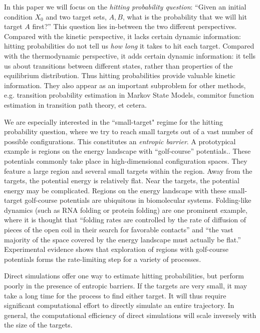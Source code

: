 \documentclass[english, aip, jcp, priprint, graphicx,floatfix]{revtex4-1}
\theoremstyle{plain}
\theoremstyle{definition}
\theoremstyle{plain}
\begin{document}
In this paper we will focus on the \emph{hitting probability question}: ``Given an initial condition $X_0$ and two target sets, $A,B$, what is the probability that we will hit target $A$ first?'' This question lies in-between the two different perspectives. Compared with the kinetic perspective, it lacks certain dynamic information: hitting probabilities do not tell us \emph{how long} it takes to hit each target.  Compared with the thermodynamic perspective, it adds certain dynamic information: it tells us about transitions between different states, rather than properties of the equilibrium distribution. Thus hitting probabilities provide valuable kinetic information.  They also appear as an important subproblem for other methods, e.g. transition probability estimation in Markov State Models, commitor function estimation in transition path theory, et cetera.

We are especially interested in the ``small-target" regime for the hitting probability question, where we try to reach small targets out of a vast number of possible configurations. This constitutes an \emph{entropic barrier}. A prototypical example is regions on the energy landscape with ``golf-course'' potentials.\cite{bicout2000entropic, Baum1986-we, Wille1987-tf}. These potentials commonly take place in high-dimensional configuration spaces. They feature a large region and several small targets within the region.  Away from the targets, the potential energy is relatively flat.  Near the targets, the potential energy may be complicated. Regions on the energy landscape with these small-target golf-course potentials are ubiquitous in biomolecular systems. Folding-like dynamics (such as RNA folding or protein folding) are one prominent example, where it is thought that ``folding rates are controlled by the rate of diffusion of pieces of the open coil in their search for favorable contacts'' and ``the vast majority of the space covered by the energy landscape must actually be flat.''\cite{McLeish2005-dq} Experimental evidence shows that exploration of regions with golf-course potentials forms the rate-limiting step for a variety of processes.\cite{Teschner1987-qs, Jacob1999-bs, Goldberg1999-mv, Plaxco1998-iv}

Direct simulations offer one way to estimate hitting probabilities, but perform poorly in the presence of entropic barriers. If the targets are very small, it may take a long time for the process to find either target.  It will thus require significant  computational effort to directly simulate an entire trajectory. In general, the computational efficiency of direct simulations will scale inversely with the size of the targets.
\end{document}
